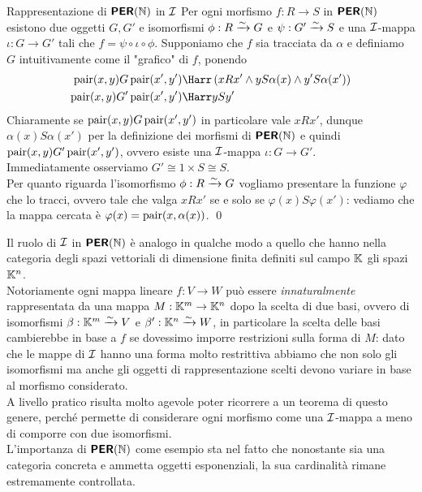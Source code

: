 \documentclass[openany]{book}
\begin{document}
\begin{proposition}{Rappresentazione di $\text{\sffamily\textbf{PER}}(\mathbb{N})$ in $\mathcal{I}$}{}
    Per ogni morfismo $f: R\to S$ in $\text{\sffamily\textbf{PER}}(\mathbb{N})$ esistono due oggetti $G, G'$ e isomorfismi $\phi :R\xrightarrow{\sim} G$ e $\psi : G'\xrightarrow{\sim} S$ e una $\mathcal{I}$-mappa $\iota: G\to G'$ tali che $f = \psi \circ \iota\circ \phi$.
    \proof 
    Supponiamo che $f$ sia tracciata da $\alpha$ e definiamo $G$ intuitivamente come il "grafico" di $f$, ponendo 
    \begin{align*}
        \pair(x,y) G \pair (x',y') & \Harr \left(xRx'\wedge yS\alpha(x)\wedge y' S \alpha(x')\right)\\
        \pair(x,y) G' \pair(x',y') & \Harr yS y'
    \end{align*}
    Chiaramente se $\operatorname{pair}(x,y)G\operatorname{pair}(x',y')$ in particolare vale $xRx'$, dunque $\alpha(x)S\alpha(x')$ per la definizione dei morfismi di $\text{\sffamily\textbf{PER}}(\mathbb{N})$ e quindi $\operatorname{pair}(x,y)G'\operatorname{pair}(x',y')$, ovvero esiste una $\mathcal{I}$-mappa $\iota:G\to G'$.\\
    Immediatamente osserviamo $G'\cong 1\times S \cong S$.\\
    Per quanto riguarda l'isomorfismo $\phi:R\xrightarrow{\sim} G$ vogliamo presentare la funzione $\varphi$ che lo tracci, ovvero tale che valga $xRx'$ se e solo se $\varphi(x) S \varphi(x')$: vediamo che la mappa cercata è $\varphi(x) = \operatorname{pair}(x, \alpha(x))$.
    \qed
\end{proposition}

Il ruolo di $\mathcal{I}$ in $\text{\sffamily\textbf{PER}}(\mathbb{N})$ è analogo in qualche modo a quello che hanno nella categoria degli spazi vettoriali di dimensione finita definiti sul campo $\mathbb{K}$ gli spazi $\mathbb{K}^n$.\\
Notoriamente ogni mappa lineare $f:V\to W$ può essere \textit{innaturalmente} rappresentata da una mappa $M:\mathbb{K}^m\to\mathbb{K}^n$ dopo la scelta di due basi, ovvero di isomorfismi $\beta :\mathbb{K}^m\xrightarrow{\sim} V$ e $\beta ':\mathbb{K}^n\xrightarrow{\sim} W$, in particolare la scelta delle basi cambierebbe in base a $f$ se dovessimo imporre restrizioni sulla forma di $M$: dato che le mappe di $\mathcal{I}$ hanno una forma molto restrittiva abbiamo che non solo gli isomorfismi ma anche gli oggetti di rappresentazione scelti devono variare in base al morfismo considerato.\\
A livello pratico risulta molto agevole poter ricorrere a un teorema di questo genere, perché permette di considerare ogni morfismo come una $\mathcal{I}$-mappa a meno di comporre con due isomorfismi.\\
L'importanza di $\text{\sffamily\textbf{PER}}(\mathbb{N})$ come esempio sta nel fatto che nonostante sia una categoria concreta e ammetta oggetti esponenziali, la sua cardinalità rimane estremamente controllata.
\end{document}
